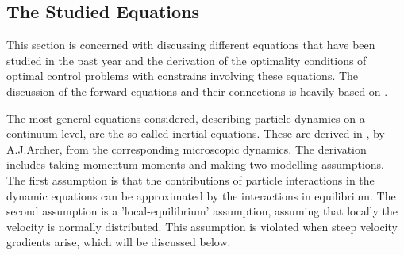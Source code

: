 \documentclass[11pt, a4paper]{article}
\theoremstyle{definition}
\begin{document}
\subsection{The Studied Equations}
This section is concerned with discussing different equations that have been studied in the past year and the derivation of the optimality conditions of optimal control problems with constrains involving these equations. The discussion of the forward equations and their connections is heavily based on \cite{Archer1}.

The most general equations considered, describing particle dynamics on a continuum level, are the so-called inertial equations. These are derived in \cite{Archer1}, by A.J.Archer, from the corresponding microscopic dynamics. The derivation includes taking momentum moments and making two modelling assumptions. The first assumption is that the contributions of particle interactions in the dynamic equations can be approximated by the interactions in equilibrium. The second assumption is a 'local-equilibrium' assumption, assuming that locally the velocity is normally distributed. This assumption is violated when steep velocity gradients arise, which will be discussed below.
\end{document}
